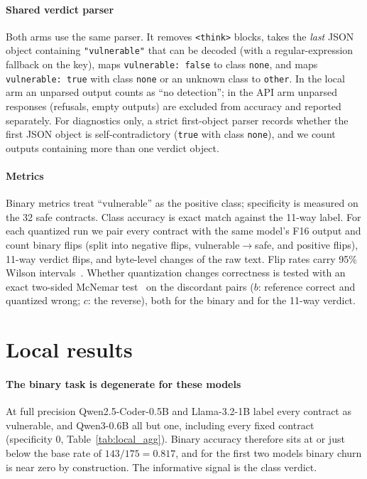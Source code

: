 \paragraph{Shared verdict parser}
Both arms use the same parser. It removes \texttt{<think>} blocks, takes the \emph{last} JSON object containing \texttt{"vulnerable"} that can be decoded (with a regular-expression fallback on the key), maps \texttt{vulnerable: false} to class \texttt{none}, and maps \texttt{vulnerable: true} with class \texttt{none} or an unknown class to \texttt{other}. In the local arm an unparsed output counts as ``no detection''; in the API arm unparsed responses (refusals, empty outputs) are excluded from accuracy and reported separately. For diagnostics only, a strict first-object parser records whether the first JSON object is self-contradictory (\texttt{true} with class \texttt{none}), and we count outputs containing more than one verdict object.

\paragraph{Metrics}
Binary metrics treat ``vulnerable'' as the positive class; specificity is measured on the 32 safe contracts. Class accuracy is exact match against the 11-way label. For each quantized run we pair every contract with the same model's F16 output and count binary flips (split into negative flips, vulnerable$\to$safe, and positive flips), 11-way verdict flips, and byte-level changes of the raw text. Flip rates carry 95\% Wilson intervals~\cite{wilson1927}. Whether quantization changes correctness is tested with an exact two-sided McNemar test~\cite{mcnemar1947} on the discordant pairs ($b$: reference correct and quantized wrong; $c$: the reverse), both for the binary and for the 11-way verdict.

\section{Local results}\label{sec:local}



\paragraph{The binary task is degenerate for these models}
At full precision Qwen2.5-Coder-0.5B and Llama-3.2-1B label every contract as vulnerable, and Qwen3-0.6B all but one, including every fixed contract (specificity 0, Table~\ref{tab:local_agg}). Binary accuracy therefore sits at or just below the base rate of $143/175=0.817$, and for the first two models binary churn is near zero by construction. The informative signal is the class verdict.

